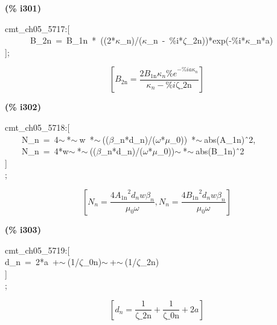 \documentclass[fleqn]{article}
\begin{document}
\noindent
\begin{minipage}[t]{4.000000em}\color{red}\bfseries
(\% i301)	
\end{minipage}
\begin{minipage}[t]{\textwidth}\color{blue}
cmt\_ch05\_5717:[\\
\ \ \ \ \ \ B\_2n\ =\ B\_1n\ *\ ((2*\ensuremath{\kappa}\_n)/(\ensuremath{\kappa}\_n\ -\ \%i*\ensuremath{\zeta}\_2n))*exp(-\%i*\ensuremath{\kappa}\_n*a)\\
];
\end{minipage}
\[\displaystyle \tag{\% o301} 
\left[ {B_{\ensuremath{\mathrm{2n}}}}=\frac{2 {B_{\ensuremath{\mathrm{1n}}}} {{\kappa }_n} {{\% e}^{-\% i a {{\kappa }_n}}}}{{{\kappa }_n}-\% i \ensuremath{\mathrm{\zeta \_ 2n}}}\right] \mbox{}
\]


\noindent
\begin{minipage}[t]{4.000000em}\color{red}\bfseries
(\% i302)	
\end{minipage}
\begin{minipage}[t]{\textwidth}\color{blue}
cmt\_ch05\_5718:[\\
\ \ \ \ N\_n\ =\ 4\ensuremath{\sim\ }*\ensuremath{\sim\ }w\ *\ensuremath{\sim\ }((\ensuremath{\beta}\_n*d\_n)/(\ensuremath{\omega}*\ensuremath{\mu}\_0))\ *\ensuremath{\sim\ }abs(A\_1n)\^\ 2,\\
\ \ \ \ N\_n\ =\ 4*w\ensuremath{\sim\ }*\ensuremath{\sim\ }((\ensuremath{\beta}\_n*d\_n)/(\ensuremath{\omega}*\ensuremath{\mu}\_0))\ensuremath{\sim\ }*\ensuremath{\sim\ }abs(B\_1n)\^\ 2\\
]\\
;
\end{minipage}
\[\displaystyle \tag{\% o302} 
\left[ {N_n}=\frac{4 {{{A_{\ensuremath{\mathrm{1n}}}}}^{2}} {d_n} w {{\beta }_n}}{{{\mu }_0} \omega }\operatorname{,}{N_n}=\frac{4 {{{B_{\ensuremath{\mathrm{1n}}}}}^{2}} {d_n} w {{\beta }_n}}{{{\mu }_0} \omega }\right] \mbox{}
\]


\noindent
\begin{minipage}[t]{4.000000em}\color{red}\bfseries
(\% i303)	
\end{minipage}
\begin{minipage}[t]{\textwidth}\color{blue}
cmt\_ch05\_5719:[\\
d\_n\ =\ 2*a\ +\ensuremath{\sim\ }(1/\ensuremath{\zeta}\_0n)\ensuremath{\sim\ }+\ensuremath{\sim\ }(1/\ensuremath{\zeta}\_2n)\\
]\\
;
\end{minipage}
\[\displaystyle \tag{\% o303} 
\left[ {d_n}=\frac{1}{\ensuremath{\mathrm{\zeta \_ 2n}}}+\frac{1}{\ensuremath{\mathrm{\zeta \_ 0n}}}+2 a\right] \mbox{}
\]
\end{document}
